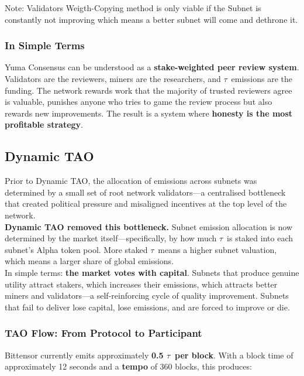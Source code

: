 \documentclass[12pt, a4paper, oneside]{report}
\newcommand{\TAO}{$\tau$}            %
\theoremstyle{definition}
\begin{document}
Note: Validators Weigth-Copying method is only viable if the Subnet is constantly not improving which means a better subnet will come and dethrone it. 


\subsubsection*{In Simple Terms}

Yuma Consensus can be understood as a \textbf{stake-weighted peer review system}. 
Validators are the reviewers, miners are the researchers, and \TAO\ emissions are 
the funding. The network rewards work that the majority of trusted reviewers 
agree is valuable, punishes anyone who tries to game the review process but also rewards new improvements. 
The result is a system where \textbf{honesty is the most profitable strategy}.



\subsection{Dynamic TAO}

Prior to Dynamic TAO, the allocation of emissions across subnets was determined 
by a small set of root network validators—a centralised bottleneck that created 
political pressure and misaligned incentives at the top level of the network.\\[0.4cm]

\textbf{Dynamic TAO removed this bottleneck.} Subnet emission allocation 
is now determined by the market itself—specifically, by how much \TAO\ is staked 
into each subnet's Alpha token pool. More staked \TAO\ means a higher subnet 
valuation, which means a larger share of global emissions.\\[0.4cm]

In simple terms: \textbf{the market votes with capital}. Subnets that produce 
genuine utility attract stakers, which increases their emissions, which attracts 
better miners and validators—a self-reinforcing cycle of quality improvement. 
Subnets that fail to deliver lose capital, lose emissions, and are forced to 
improve or die.

\subsubsection*{TAO Flow: From Protocol to Participant}

Bittensor currently emits approximately \textbf{0.5 \TAO\ per block}. With a block time of 
approximately 12 seconds and a \textbf{tempo} of 360 blocks, this produces:
\end{document}
